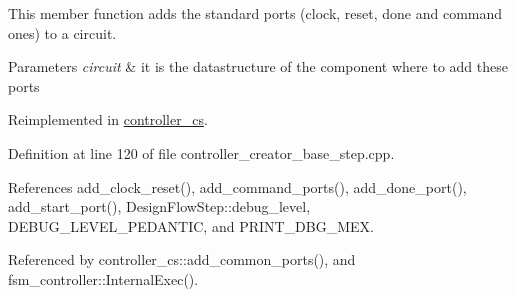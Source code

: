 This member function adds the standard ports (clock, reset, done and command ones) to a circuit. 


\begin{DoxyParams}{Parameters}
{\em circuit} & it is the datastructure of the component where to add these ports \\
\hline
\end{DoxyParams}


Reimplemented in \hyperlink{classcontroller__cs_a8e36030a52dc30ae10633fc28a45a2bb}{controller\+\_\+cs}.



Definition at line 120 of file controller\+\_\+creator\+\_\+base\+\_\+step.\+cpp.



References add\+\_\+clock\+\_\+reset(), add\+\_\+command\+\_\+ports(), add\+\_\+done\+\_\+port(), add\+\_\+start\+\_\+port(), Design\+Flow\+Step\+::debug\+\_\+level, D\+E\+B\+U\+G\+\_\+\+L\+E\+V\+E\+L\+\_\+\+P\+E\+D\+A\+N\+T\+IC, and P\+R\+I\+N\+T\+\_\+\+D\+B\+G\+\_\+\+M\+EX.



Referenced by controller\+\_\+cs\+::add\+\_\+common\+\_\+ports(), and fsm\+\_\+controller\+::\+Internal\+Exec().

